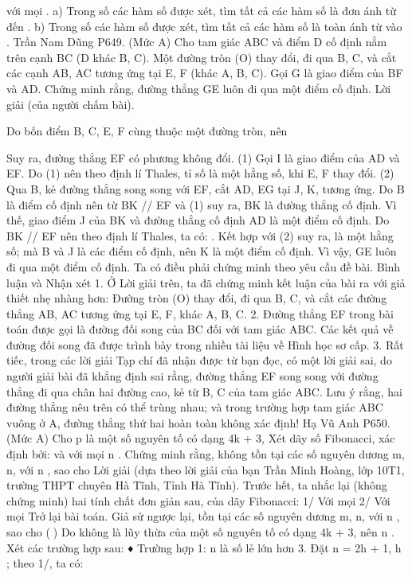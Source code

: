 \begin{multicols}{2}
	với mọi  .
	a) Trong số các hàm số được xét, tìm tất cả các hàm số là đơn ánh từ   đến  .
	b) Trong số các hàm số được xét, tìm tất cả các hàm số là toàn ánh từ   vào  .
	Trần Nam Dũng
	P649. (Mức A) Cho tam giác ABC và điểm D cố định nằm trên cạnh BC (D khác B, C). Một đường tròn (O) thay đổi, đi qua B, C, và cắt các cạnh AB, AC tương ứng tại E, F (khác A, B, C). Gọi G là giao điểm của BF và AD. Chứng minh rằng, đường thẳng GE luôn đi qua một điểm cố định.
	Lời giải (của người chấm bài).
	
	Do bốn điểm B, C, E, F cùng thuộc một đường tròn, nên
	
	Suy ra, đường thẳng EF có phương không đổi.                                                                                      (1)
	Gọi I là giao điểm của AD và EF. Do (1) nên theo định lí Thales, tỉ số   là một hằng số, khi E, F thay đổi.                                                                                                                                                  (2)
	Qua B, kẻ đường thẳng song song với EF, cắt AD, EG tại J, K, tương ứng.
	Do B là điểm cố định nên từ BK // EF và (1) suy ra, BK là đường thẳng cố định. Vì thế, giao điểm J của BK và đường thẳng cố định AD là một điểm cố định.
	Do BK // EF nên theo định lí Thales, ta có:
	.
	Kết hợp với (2) suy ra,   là một hằng số; mà B và J là các điểm cố định, nên K là một điểm cố định.
	Vì vậy, GE luôn đi qua một điểm cố định. Ta có điều phải chứng minh theo yêu cầu đề bài.
	Bình luận và Nhận xét
	1. Ở Lời giải trên, ta đã chứng minh kết luận của bài ra với giả thiết nhẹ nhàng hơn: Đường tròn (O) thay đổi, đi qua B, C, và cắt các đường thẳng AB, AC tương ứng tại E, F, khác A, B, C.
	2. Đường thẳng EF trong bài toán được gọi là đường đối song của BC đối với tam giác ABC. Các kết quả về đường đối song đã được trình bày trong nhiều tài liệu về Hình học sơ cấp.
	3. Rất tiếc, trong các lời giải Tạp chí đã nhận được từ bạn đọc, có một lời giải sai, do người giải bài đã khẳng định sai rằng, đường thẳng EF song song với đường thẳng đi qua chân hai đường cao, kẻ từ B, C của tam giác ABC.
	Lưu ý rằng, hai đường thẳng nêu trên có thể trùng nhau; và trong trường hợp tam giác ABC vuông ở A, đường thẳng thứ hai hoàn toàn không xác định!
	Hạ Vũ Anh
	P650. (Mức A) Cho p là một số nguyên tố có dạng 4k + 3,   Xét dãy số Fibonacci, xác định bởi:     và
	với mọi n .
	Chứng minh rằng, không tồn tại các số nguyên dương m, n, với n , sao cho  
	Lời giải (dựa theo lời giải của bạn Trần Minh Hoàng, lớp 10T1, trường THPT chuyên Hà Tĩnh, Tỉnh Hà Tĩnh).
	Trước hết, ta nhắc lại (không chứng minh) hai tính chất đơn giản sau, của dãy Fibonacci:
	1/ Với mọi    
	2/ Với mọi    
	Trở lại bài toán.
	Giả sử ngược lại, tồn tại các số nguyên dương m, n, với n , sao cho                                      ()
	Do   không là lũy thừa của một số nguyên tố có dạng 4k + 3, nên n .
	Xét các trường hợp sau:
	♦ Trường hợp 1: n là số lẻ lớn hơn 3.
	Đặt n = 2h + 1,   h ; theo 1/, ta có:
	

\end{multicols}
